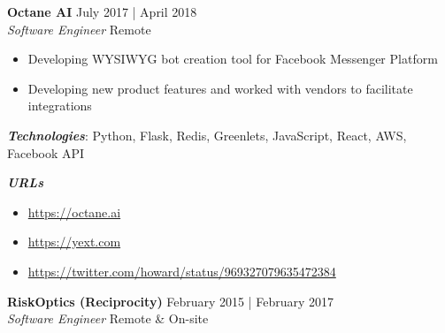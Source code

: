 \documentclass[a4paper]{article}
\newenvironment{jobdetails}%
    {\list{}{\leftmargin=4mm}\item[]}%
    {\endlist}
\begin{document}
\textbf{Octane AI} \hfill July 2017 | April 2018 \\
\textit{Software Engineer} \hfill Remote \\
\vspace{2mm}

\begin{jobdetails}
\begin{itemize}
    \item Developing WYSIWYG bot creation tool for Facebook Messenger Platform
    \item Developing new product features and worked with vendors to facilitate integrations
\end{itemize}

\vspace{2mm}

\textbf{\textit{Technologies}}: Python, Flask, Redis, Greenlets, JavaScript, React, AWS, Facebook API

\textbf{\textit{URLs}}
\begin{itemize} \itemsep 1pt
	\item \url{https://octane.ai}
    \item \url{https://yext.com}
    \item \url{https://twitter.com/howard/status/969327079635472384}
\end{itemize}

\end{jobdetails}
\vspace{1mm}




\textbf{RiskOptics (Reciprocity)} \hfill February 2015 | February 2017 \\
\textit{Software Engineer} \hfill Remote \& On-site \\
\vspace{2mm}
\end{document}
